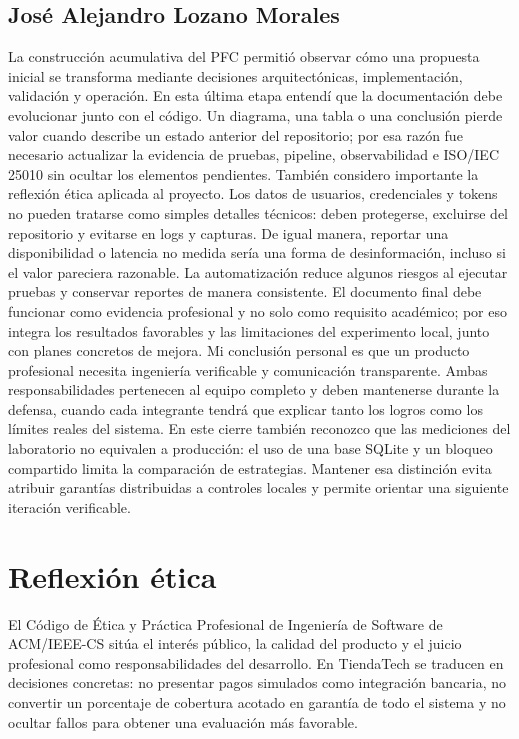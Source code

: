 \documentclass[12pt,a4paper]{article}
\newcommand{\seccion}[1]{\section{#1}}
\begin{document}
\subsection{José Alejandro Lozano Morales}
La construcción acumulativa del PFC permitió observar cómo una propuesta inicial se transforma mediante decisiones arquitectónicas, implementación, validación y operación. En esta última etapa entendí que la documentación debe evolucionar junto con el código. Un diagrama, una tabla o una conclusión pierde valor cuando describe un estado anterior del repositorio; por esa razón fue necesario actualizar la evidencia de pruebas, pipeline, observabilidad e ISO/IEC 25010 sin ocultar los elementos pendientes. También considero importante la reflexión ética aplicada al proyecto. Los datos de usuarios, credenciales y tokens no pueden tratarse como simples detalles técnicos: deben protegerse, excluirse del repositorio y evitarse en logs y capturas. De igual manera, reportar una disponibilidad o latencia no medida sería una forma de desinformación, incluso si el valor pareciera razonable. La automatización reduce algunos riesgos al ejecutar pruebas y conservar reportes de manera consistente. El documento final debe funcionar como evidencia profesional y no solo como requisito académico; por eso integra los resultados favorables y las limitaciones del experimento local, junto con planes concretos de mejora. Mi conclusión personal es que un producto profesional necesita ingeniería verificable y comunicación transparente. Ambas responsabilidades pertenecen al equipo completo y deben mantenerse durante la defensa, cuando cada integrante tendrá que explicar tanto los logros como los límites reales del sistema. En este cierre también reconozco que las mediciones del laboratorio no equivalen a producción: el uso de una base SQLite y un bloqueo compartido limita la comparación de estrategias. Mantener esa distinción evita atribuir garantías distribuidas a controles locales y permite orientar una siguiente iteración verificable.


\seccion{Reflexión ética}
El Código de Ética y Práctica Profesional de Ingeniería de Software de ACM/IEEE-CS \cite{acmieee} sitúa el interés público, la calidad del producto y el juicio profesional como responsabilidades del desarrollo. En TiendaTech se traducen en decisiones concretas: no presentar pagos simulados como integración bancaria, no convertir un porcentaje de cobertura acotado en garantía de todo el sistema y no ocultar fallos para obtener una evaluación más favorable.
\end{document}
